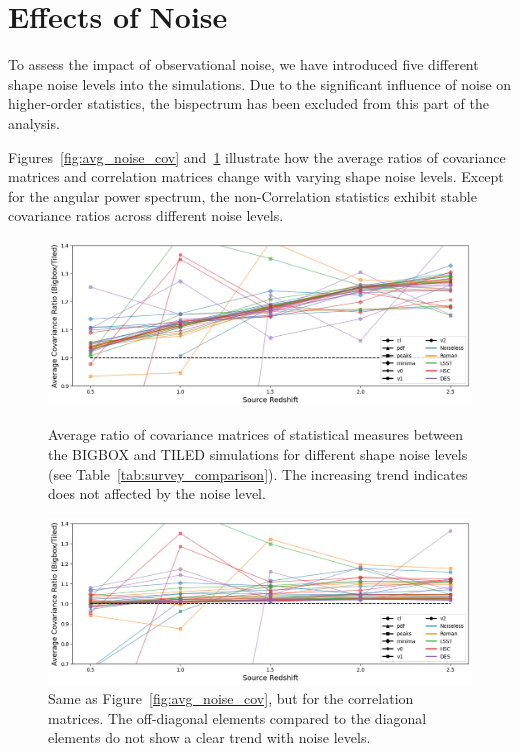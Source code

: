 \section{Effects of Noise}
To assess the impact of observational noise, we have introduced five different shape noise levels into the simulations. Due to the significant influence of noise on higher-order statistics, the bispectrum has been excluded from this part of the analysis.

Figures~\ref{fig:avg_noise_cov} and~\ref{fig:avg_noise_corr} illustrate how the average ratios of covariance matrices and correlation matrices change with varying shape noise levels. Except for the angular power spectrum, the non-Correlation statistics exhibit stable covariance ratios across different noise levels. 

\begin{figure}[p]
    \centering
    \includegraphics[width=\textwidth]{figures/results/avg_cov_ratio_ngal.png}
    \caption[Average BIGBOX/TILED Ratio of Covariance for multiple noise levels]{Average ratio of covariance matrices of statistical measures between the BIGBOX and TILED simulations for different shape noise levels (see Table~\ref{tab:survey_comparison}). The increasing trend indicates does not affected by the noise level.}
    \label{fig:avg_noise_cov}
    \vspace{2cm}
    \includegraphics[width=\textwidth]{figures/results/avg_corr_ratio_ngal.png}
    \caption[Average BIGBOX/TILED Ratio of Correlation for multiple noise levels]{Same as Figure~\ref{fig:avg_noise_cov}, but for the correlation matrices. The off-diagonal elements compared to the diagonal elements do not show a clear trend with noise levels.}
    \label{fig:avg_noise_corr}
\end{figure}

